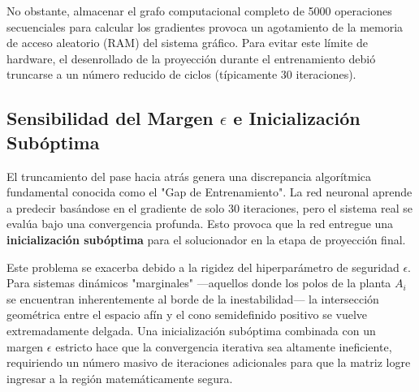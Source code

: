 No obstante, almacenar el grafo computacional completo de 5000 operaciones secuenciales para calcular los gradientes provoca un agotamiento de la memoria de acceso aleatorio (RAM) del sistema gráfico. Para evitar este límite de hardware, el desenrollado de la proyección durante el entrenamiento debió truncarse a un número reducido de ciclos (típicamente 30 iteraciones).

\subsection{Sensibilidad del Margen $\epsilon$ e Inicialización Subóptima}
El truncamiento del pase hacia atrás genera una discrepancia algorítmica fundamental conocida como el "Gap de Entrenamiento". La red neuronal aprende a predecir basándose en el gradiente de solo 30 iteraciones, pero el sistema real se evalúa bajo una convergencia profunda. Esto provoca que la red entregue una \textbf{inicialización subóptima} para el solucionador en la etapa de proyección final.

Este problema se exacerba debido a la rigidez del hiperparámetro de seguridad $\epsilon$. Para sistemas dinámicos "marginales" —aquellos donde los polos de la planta $A_i$ se encuentran inherentemente al borde de la inestabilidad— la intersección geométrica entre el espacio afín y el cono semidefinido positivo se vuelve extremadamente delgada. Una inicialización subóptima combinada con un margen $\epsilon$ estricto hace que la convergencia iterativa sea altamente ineficiente, requiriendo un número masivo de iteraciones adicionales para que la matriz logre ingresar a la región matemáticamente segura. 